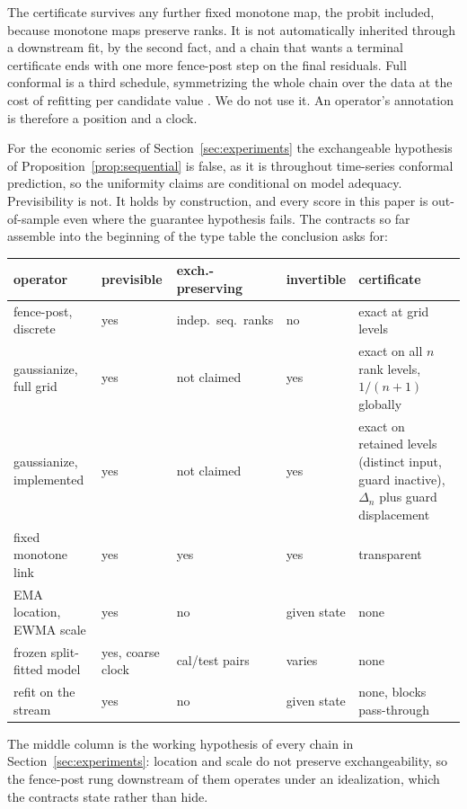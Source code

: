 \documentclass[11pt]{article}
\theoremstyle{remark}
\begin{document}
The certificate survives any further fixed monotone map, the probit included, because
monotone maps preserve ranks. It is not automatically inherited through a downstream
fit, by the second fact,
and a chain that wants a terminal certificate ends with one more fence-post step on the
final residuals. Full conformal is a third schedule, symmetrizing the whole chain over
the data at the cost of refitting per candidate value \citep{vovk2005algorithmic}. We do
not use it. An operator's annotation is therefore a position and a clock.

For the economic series of Section~\ref{sec:experiments} the exchangeable hypothesis of
Proposition~\ref{prop:sequential} is false, as it is throughout time-series conformal
prediction, so the uniformity claims are conditional on model adequacy. Previsibility is
not. It holds by construction, and every score in this paper is out-of-sample even where
the guarantee hypothesis fails. The contracts so far assemble into the beginning of the
type table the conclusion asks for:

\begin{center}
\footnotesize
\setlength{\tabcolsep}{4pt}
\begin{tabular}{lllp{5.2em}>{\raggedright\arraybackslash}p{11em}}
\toprule
operator & previsible & exch.-preserving & invertible & certificate \\
\midrule
fence-post, discrete & yes & indep.\ seq.\ ranks & no &
  exact at grid levels \\
gaussianize, full grid & yes & not claimed & yes &
  exact on all $n$ rank levels, $1/(n{+}1)$ globally \\
gaussianize, implemented & yes & not claimed & yes &
  exact on retained levels (distinct input, guard inactive), $\Delta_n$ plus guard
  displacement \\
fixed monotone link & yes & yes & yes & transparent \\
EMA location, EWMA scale & yes & no & given state & none \\
frozen split-fitted model & yes, coarse clock & cal/test pairs & varies & none \\
refit on the stream & yes & no & given state & none, blocks pass-through \\
\bottomrule
\end{tabular}
\end{center}

The middle column is the working hypothesis of every chain in
Section~\ref{sec:experiments}: location and scale do not preserve exchangeability, so the
fence-post rung downstream of them operates under an idealization, which the contracts
state rather than hide.
\end{document}

